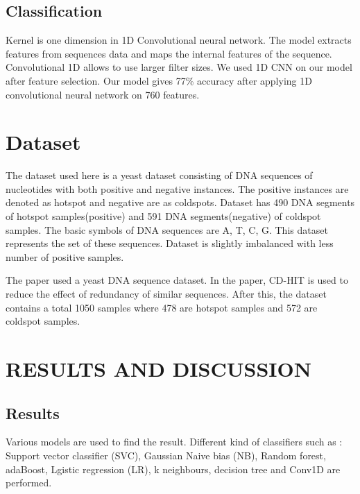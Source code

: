 \documentclass[letterpaper, 10 pt, conference]{ieeeconf}  %
\begin{document}
\subsection{Classification}
Kernel is one dimension in 1D Convolutional neural network. The model extracts features from sequences data and maps the internal features of the sequence. Convolutional 1D allows to use larger filter sizes. We used 1D CNN on our model after feature selection. Our model gives 77\% accuracy after applying 1D convolutional neural network on 760 features.

\section{Dataset}

The dataset used here is a yeast dataset consisting of DNA sequences of nucleotides with both positive and negative instances. The positive instances are denoted as hotspot and negative are as coldspots. Dataset has 490 DNA segments of hotspot samples(positive) and 591 DNA segments(negative) of coldspot samples. The basic symbols of DNA sequences are A, T, C, G. This dataset represents the set of these sequences. Dataset is slightly imbalanced with less number of positive samples. 

The paper used a yeast DNA sequence dataset. In the paper, CD-HIT is used to reduce the effect of redundancy of similar sequences. After this, the dataset contains a total 1050 samples where 478 are hotspot samples and 572 are coldspot samples. 



\section{RESULTS AND DISCUSSION}



\subsection{Results}
Various models are used to find the result. Different kind of classifiers such as : Support vector classifier (SVC), Gaussian Naive bias (NB), Random forest, adaBoost, Lgistic regression (LR), k neighbours, decision tree and Conv1D are performed.
 
\end{document}
